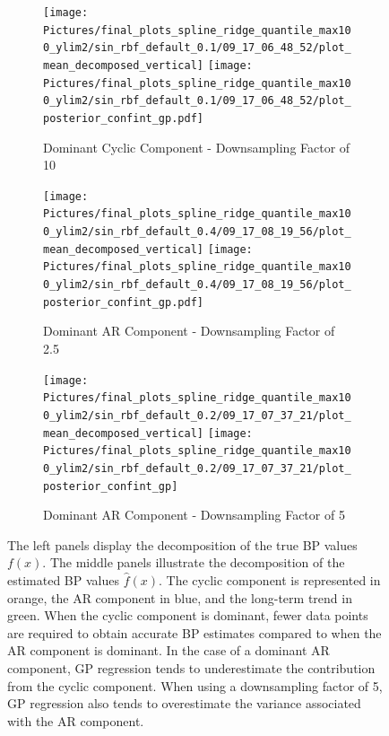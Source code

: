 \begin{figure}

\begin{subfigure}{\textwidth}
    \centering
    \texttt{[image: 
    Pictures/final\_plots\_spline\_ridge\_quantile\_max100\_ylim2/sin\_rbf\_default\_0.1/09\_17\_06\_48\_52/plot\_mean\_decomposed\_vertical]}
    \texttt{[image: 
    Pictures/final\_plots\_spline\_ridge\_quantile\_max100\_ylim2/sin\_rbf\_default\_0.1/09\_17\_06\_48\_52/plot\_posterior\_confint\_gp.pdf]}
  \caption{Dominant Cyclic Component - Downsampling Factor of 10}
\end{subfigure}

\begin{subfigure}{\textwidth}
    \centering
    \texttt{[image: 
        Pictures/final\_plots\_spline\_ridge\_quantile\_max100\_ylim2/sin\_rbf\_default\_0.4/09\_17\_08\_19\_56/plot\_mean\_decomposed\_vertical]}
    \texttt{[image: 
         Pictures/final\_plots\_spline\_ridge\_quantile\_max100\_ylim2/sin\_rbf\_default\_0.4/09\_17\_08\_19\_56/plot\_posterior\_confint\_gp.pdf]}
  \caption{Dominant AR Component - Downsampling Factor of 2.5}
    \label{subfig:mean-decomposed-ar-low-downsampling}
\end{subfigure}\hfill

\begin{subfigure}{\textwidth}
    \centering
    \texttt{[image: 
    Pictures/final\_plots\_spline\_ridge\_quantile\_max100\_ylim2/sin\_rbf\_default\_0.2/09\_17\_07\_37\_21/plot\_mean\_decomposed\_vertical]}
    \texttt{[image: 
       Pictures/final\_plots\_spline\_ridge\_quantile\_max100\_ylim2/sin\_rbf\_default\_0.2/09\_17\_07\_37\_21/plot\_posterior\_confint\_gp]}
  \caption{Dominant AR Component - Downsampling Factor of 5}
    \label{subfig:mean-decomposed-ar}
\end{subfigure}\hfill
\label{fig:mean-decomposed-ar-cyclic}
\caption[Dominant Cyclic Component vs. Dominant AR Component: Decomposition of $f(x)$]{
    The left panels display the decomposition of the true BP values $f(x)$.
    The middle panels illustrate the decomposition of the estimated BP values $\hat{f}(x)$.
    The cyclic component is represented in orange,
    the AR component in blue, and the long-term trend in green.
    When the cyclic component is dominant, fewer data points are required to obtain accurate BP estimates
    compared to when the AR component is dominant.
    In the case of a dominant AR component, GP regression tends to underestimate
    the contribution from the cyclic component.
    When using a downsampling factor of 5, GP regression also tends to overestimate
    the variance associated with the AR component.
}

\end{figure}

